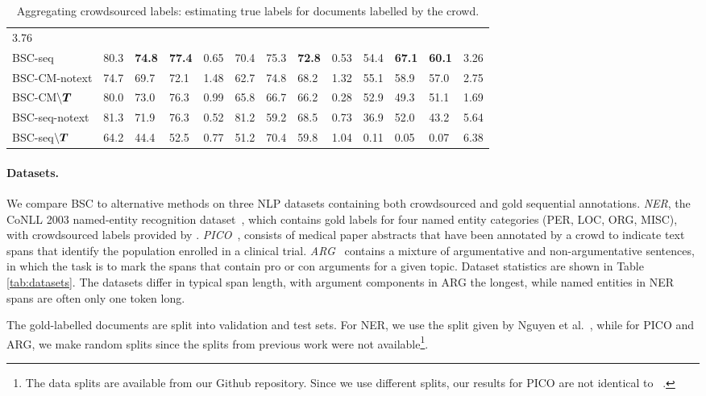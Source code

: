 \begin{table}
\begin{tabular}{l l l l r@{\hskip 0.8cm} l l l r@{\hskip 0.8cm} l l l r }
3.76 
\\ 
BSC-seq & 
80.3 & \textbf{74.8} & \textbf{77.4} & 0.65 & 
70.4 & 75.3 & \textbf{72.8} & 0.53 & 
54.4 & \textbf{67.1} & \textbf{60.1} & %
 3.26
\\ \midrule
BSC-CM-notext & 
74.7 & 69.7 & 72.1 & 1.48 & 
62.7 & 74.8 & 68.2 & 1.32 & 
55.1 & 58.9 & 57.0 & 2.75
\\
BSC-CM$\backslash\boldsymbol T$ & 
80.0 & 73.0 & 76.3 & 0.99 &
65.8 & 66.7 & 66.2 & 0.28 &
52.9 & 49.3 & 51.1 & 1.69
 \\
BSC-seq-notext & 
81.3 & 71.9 & 76.3 & 0.52 & 
81.2 & 59.2 & 68.5 & 0.73 &
36.9 & 52.0 & 43.2 & 5.64 
\\ 
BSC-seq$\backslash\boldsymbol T$ & 
64.2 & 44.4 & 52.5 & 0.77 &
51.2 & 70.4 & 59.8 & 1.04 &
0.11 & 0.05 & 0.07 & 6.38
\\
\bottomrule 
\end{tabular}
\caption{Aggregating crowdsourced labels: estimating true labels for documents labelled by the crowd.}
\label{tab:aggregation_results}
\npnoround
\end{table}

\paragraph{Datasets. }\label{sec:expts}

We compare BSC to alternative methods on three NLP datasets
containing both crowdsourced and gold sequential annotations.
\emph{NER}, the CoNLL 2003 named-entity recognition dataset~\cite{tjong2003introduction},
which contains gold labels for four named entity categories (PER, LOC, ORG, MISC),
with crowdsourced labels provided by \cite{rodrigues2014sequence}.
\emph{PICO}~\cite{nguyen2017aggregating}, 
consists of medical paper abstracts that have been annotated by a crowd to indicate text spans that identify the population enrolled in a clinical trial. 
\emph{ARG}~\cite{trautmann2019robust} contains a mixture of argumentative and non-argumentative sentences, in which the task is to mark the spans 
that contain pro or con arguments for a given topic. 
Dataset statistics are shown in Table \ref{tab:datasets}. 
The datasets differ in typical span length, with argument components in ARG the longest, while named entities in NER spans are often only
one token long.

The gold-labelled documents are split into validation and test sets. 
For NER, we use the split given by Nguyen et al.~,
while for PICO and ARG, we make random splits since the splits from previous work
were not available\footnote{The data splits are available from our Github repository.
Since we use different splits, our results for PICO are not identical to ~\citet{nguyen2017aggregating}.}.

